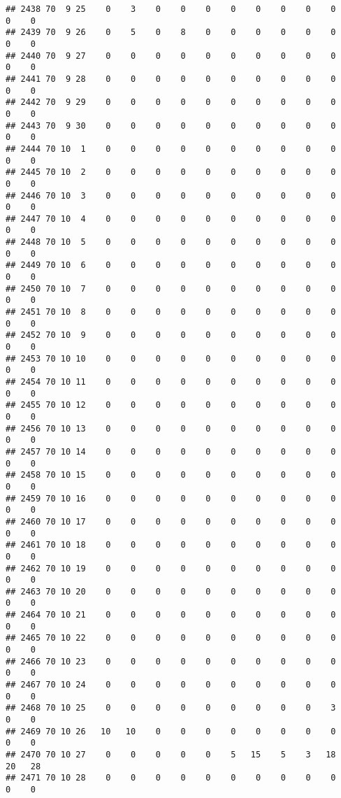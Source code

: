 \documentclass[]{article}
\begin{document}
\begin{verbatim}
## 2438 70  9 25    0    3    0    0    0    0    0    0    0    0    0    0
## 2439 70  9 26    0    5    0    8    0    0    0    0    0    0    0    0
## 2440 70  9 27    0    0    0    0    0    0    0    0    0    0    0    0
## 2441 70  9 28    0    0    0    0    0    0    0    0    0    0    0    0
## 2442 70  9 29    0    0    0    0    0    0    0    0    0    0    0    0
## 2443 70  9 30    0    0    0    0    0    0    0    0    0    0    0    0
## 2444 70 10  1    0    0    0    0    0    0    0    0    0    0    0    0
## 2445 70 10  2    0    0    0    0    0    0    0    0    0    0    0    0
## 2446 70 10  3    0    0    0    0    0    0    0    0    0    0    0    0
## 2447 70 10  4    0    0    0    0    0    0    0    0    0    0    0    0
## 2448 70 10  5    0    0    0    0    0    0    0    0    0    0    0    0
## 2449 70 10  6    0    0    0    0    0    0    0    0    0    0    0    0
## 2450 70 10  7    0    0    0    0    0    0    0    0    0    0    0    0
## 2451 70 10  8    0    0    0    0    0    0    0    0    0    0    0    0
## 2452 70 10  9    0    0    0    0    0    0    0    0    0    0    0    0
## 2453 70 10 10    0    0    0    0    0    0    0    0    0    0    0    0
## 2454 70 10 11    0    0    0    0    0    0    0    0    0    0    0    0
## 2455 70 10 12    0    0    0    0    0    0    0    0    0    0    0    0
## 2456 70 10 13    0    0    0    0    0    0    0    0    0    0    0    0
## 2457 70 10 14    0    0    0    0    0    0    0    0    0    0    0    0
## 2458 70 10 15    0    0    0    0    0    0    0    0    0    0    0    0
## 2459 70 10 16    0    0    0    0    0    0    0    0    0    0    0    0
## 2460 70 10 17    0    0    0    0    0    0    0    0    0    0    0    0
## 2461 70 10 18    0    0    0    0    0    0    0    0    0    0    0    0
## 2462 70 10 19    0    0    0    0    0    0    0    0    0    0    0    0
## 2463 70 10 20    0    0    0    0    0    0    0    0    0    0    0    0
## 2464 70 10 21    0    0    0    0    0    0    0    0    0    0    0    0
## 2465 70 10 22    0    0    0    0    0    0    0    0    0    0    0    0
## 2466 70 10 23    0    0    0    0    0    0    0    0    0    0    0    0
## 2467 70 10 24    0    0    0    0    0    0    0    0    0    0    0    0
## 2468 70 10 25    0    0    0    0    0    0    0    0    0    3    0    0
## 2469 70 10 26   10   10    0    0    0    0    0    0    0    0    0    0
## 2470 70 10 27    0    0    0    0    0    5   15    5    3   18   20   28
## 2471 70 10 28    0    0    0    0    0    0    0    0    0    0    0    0

\end{verbatim}
\end{document}
